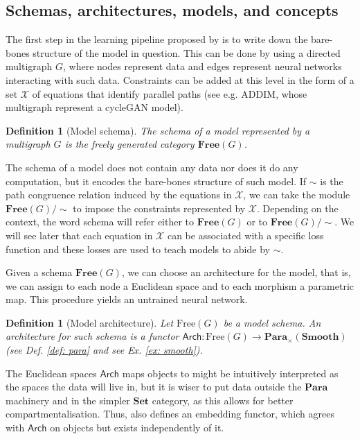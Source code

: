 \documentclass[11pt,a4paper,openright,twoside]{report}
\newcounter{mycounter}
\theoremstyle{plain}
\newtheorem{definition}[mycounter]{Definition}
\theoremstyle{definition}
\begin{document}
\subsection{Schemas, architectures, models, and concepts}

The first step in the learning pipeline proposed by \cite{gavranovic2019compositional} is to write down the bare-bones structure of the model in question. This can be done by using a directed multigraph $G$, where nodes represent data and edges represent neural networks interacting with such data. Constraints can be added at this level in the form of a set $\mathcal{X}$ of equations that identify parallel paths (see e.g. ADDIM, whose multigraph represent a cycleGAN model). 

\begin{definition}[Model schema]
  The schema of a model represented by a multigraph $G$ is the freely generated category $\mathbf{Free}(G)$.
\end{definition}

The schema of a model does not contain any data nor does it do any computation, but it encodes the bare-bones structure of such model. If ${\sim}$ is the path congruence relation induced by the equations in $\mathcal{X}$, we can take the module $\mathbf{Free}(G)/{\sim}$ to impose the constraints represented by $\mathcal{X}$. Depending on the context, the word schema will refer either to $\mathbf{Free}(G)$ or to $\mathbf{Free}(G)/{\sim}$. We will see later that each equation in $\mathcal{X}$ can be associated with a specific loss function and these losses are used to teach models to abide by ${\sim}$.

Given a schema $\mathbf{Free}(G)$, we can choose an architecture for the model, that is, we can assign to each node a Euclidean space and to each morphism a parametric map. This procedure yields an untrained neural network.

\begin{definition}[Model architecture]
  Let $\mathrm{Free}(G)$ be a model schema. An architecture for such schema is a functor $\mathsf{Arch}: \mathrm{Free}(G) \to \mathbf{Para}_{\times}(\mathbf{Smooth})$ (see \textit{Def. \ref{def: para}} and see \textit{Ex. \ref{ex: smooth}}).
\end{definition}

The Euclidean spaces $\mathsf{Arch}$ maps objects to might be intuitively interpreted as the spaces the data will live in, but it is wiser to put data outside the $\mathbf{Para}$ machinery and in the simpler $\mathbf{Set}$ category, as this allows for better compartmentalisation. Thus, \cite{gavranovic2019compositional} also defines an embedding functor, which agrees with $\mathsf{Arch}$ on objects but exists independently of it.
\end{document}
